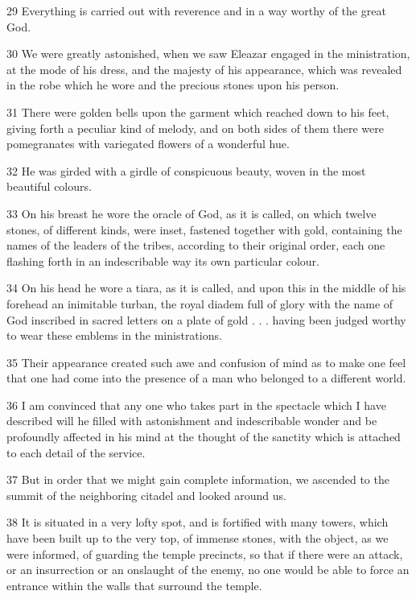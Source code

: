 \par 29 Everything is carried out with reverence and in a way worthy of the great God.

\par 30 We were greatly astonished, when we saw Eleazar engaged in the ministration, at the mode of his dress, and the majesty of his appearance, which was revealed in the robe which he wore and the precious stones upon his person.

\par 31 There were golden bells upon the garment which reached down to his feet, giving forth a peculiar kind of melody, and on both sides of them there were pomegranates with variegated flowers of a wonderful hue.

\par 32 He was girded with a girdle of conspicuous beauty, woven in the most beautiful colours.

\par 33 On his breast he wore the oracle of God, as it is called, on which twelve stones, of different kinds, were inset, fastened together with gold, containing the names of the leaders of the tribes, according to their original order, each one flashing forth in an indescribable way its own particular colour.

\par 34 On his head he wore a tiara, as it is called, and upon this in the middle of his forehead an inimitable turban, the royal diadem full of glory with the name of God inscribed in sacred letters on a plate of gold . . . having been judged worthy to wear these emblems in the ministrations.

\par 35 Their appearance created such awe and confusion of mind as to make one feel that one had come into the presence of a man who belonged to a different world.

\par 36 I am convinced that any one who takes part in the spectacle which I have described will he filled with astonishment and indescribable wonder and be profoundly affected in his mind at the thought of the sanctity which is attached to each detail of the service.

\par 37 But in order that we might gain complete information, we ascended to the summit of the neighboring citadel and looked around us.

\par 38 It is situated in a very lofty spot, and is fortified with many towers, which have been built up to the very top, of immense stones, with the object, as we were informed, of guarding the temple precincts, so that if there were an attack, or an insurrection or an onslaught of the enemy, no one would be able to force an entrance within the walls that surround the temple.


